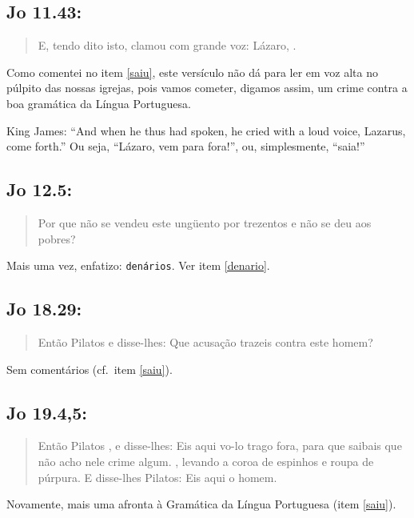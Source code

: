 \subsection{Jo 11.43:}
\begin{quote}
    \small
E, tendo dito isto, clamou com grande voz: Lázaro, .
\end{quote}

Como comentei no item \ref{saiu}, este versículo não dá para ler em voz alta no púlpito das nossas igrejas, pois vamos cometer, digamos assim, um crime contra a boa gramática da Língua Portuguesa.

King James: ``And when he thus had spoken, he cried with a loud voice,
Lazarus, come forth.'' Ou seja, ``Lázaro, vem para fora!'', ou, simplesmente, ``saia!''


\subsection{Jo 12.5:} 
\begin{quote}
    \small
Por que não se vendeu este ungüento por trezentos  e não se deu aos pobres?
\end{quote}

Mais uma vez, enfatizo: \texttt{denários}. Ver item \ref{denario}.


\subsection{Jo 18.29:} 
\begin{quote}
    \small
Então Pilatos  e disse-lhes: Que acusação
trazeis contra este homem?
\end{quote}

Sem comentários (cf.~item \ref{saiu}).

\subsection{Jo 19.4,5:}
\begin{quote}
    \small
Então Pilatos , e disse-lhes: Eis aqui vo-lo trago fora, para que saibais que não acho nele crime algum. , levando a coroa de espinhos e roupa de púrpura. E disse-lhes Pilatos: Eis aqui o homem.
\end{quote}

Novamente, mais uma afronta à Gra\-má\-tica da Lín\-gua Por\-tu\-gue\-sa (i\-tem \ref{saiu}).

